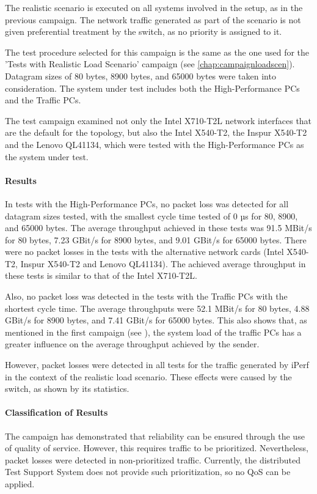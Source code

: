 The realistic scenario is executed on all systems involved in the setup, as in the previous campaign. The network traffic generated as part of the scenario is not given preferential treatment by the switch, as no priority is assigned to it.

The test procedure selected for this campaign is the same as the one used for the 'Tests with Realistic Load Scenario' campaign (see \ref{chap:campaignloadscen}). Datagram sizes of 80 bytes, 8900 bytes, and 65000 bytes were taken into consideration. The system under test includes both the High-Performance PCs and the Traffic PCs.

The test campaign examined not only the Intel X710-T2L network interfaces that are the default for the topology, but also the Intel X540-T2, the Inspur X540-T2 and the Lenovo QL41134, which were tested with the High-Performance PCs as the system under test.

\paragraph{Results}
In tests with the High-Performance PCs, no packet loss was detected for all datagram sizes tested, with the smallest cycle time tested of 0 µs for 80, 8900, and 65000 bytes. The average throughput achieved in these tests was 91.5 MBit/s for 80 bytes, 7.23 GBit/s for 8900 bytes, and 9.01 GBit/s for 65000 bytes. There were no packet losses in the tests with the alternative network cards (Intel X540-T2, Inspur X540-T2 and Lenovo QL41134). The achieved average throughput in these tests is similar to that of the Intel X710-T2L.

Also, no packet loss was detected in the tests with the Traffic PCs with the shortest cycle time. The average throughputs were 52.1 MBit/s for 80 bytes, 4.88 GBit/s for 8900 bytes, and 7.41 GBit/s for 65000 bytes. This also shows that, as mentioned in the first campaign (see \label{chap:relcamp1}), the system load of the traffic PCs has a greater influence on the average throughput achieved by the sender.

However, packet losses were detected in all tests for the traffic generated by iPerf in the context of the realistic load scenario. These effects were caused by the switch, as shown by its statistics.

\paragraph{Classification of Results}
The campaign has demonstrated that reliability can be ensured through the use of quality of service. However, this requires traffic to be prioritized. Nevertheless, packet losses were detected in non-prioritized traffic. Currently, the distributed Test Support System does not provide such prioritization, so no QoS can be applied.

